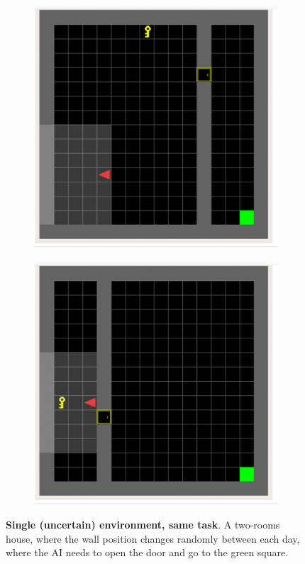 \documentclass[10pt]{article} %
\begin{document}
  \begin{figure}
    \centering
    \begin{subfigure}[b]{0.45\textwidth}
    \includegraphics[width=1\textwidth]{figures/same_1.png}
    \end{subfigure}
    \begin{subfigure}[b]{0.45\textwidth}
      \includegraphics[width=1\textwidth]{figures/same_2.png}
      \end{subfigure}
    \caption{\textbf{Single (uncertain) environment, same task}. A two-rooms house, where the wall position changes randomly between each day, where the AI needs to open the door and go to the green square.} 
    \end{figure}
\end{document}
